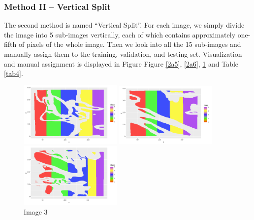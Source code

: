 \documentclass[11pt]{article}
\theoremstyle{definition}
\begin{document}
\subsubsection*{Method II -- Vertical Split}
The second method is named ``Vertical Split''. For each image, we simply divide the image into 5 sub-images vertically, each of which contains approximately one-fifth of pixels of the whole image. Then we look into all the 15 sub-images and manually assign them to the training, validation, and testing set. Visualization and manual assignment is displayed in Figure Figure \ref{2a5}, \ref{2a6}, \ref{2a7} and Table \ref{tab4}.

\begin{figure}[h]
\begin{minipage}[t]{0.33\textwidth}
\centering
\includegraphics[width=5cm]{figures/2a5.png}
\caption{Image 1}
\label{2a5}
\end{minipage}
\begin{minipage}[t]{0.33\textwidth}
\centering
\includegraphics[width=5cm]{figures/2a6.png}
\caption{Image 2}
\label{2a6}
\end{minipage}
\begin{minipage}[t]{0.33\textwidth}
\centering
\includegraphics[width=5cm]{figures/2a7.png}
\caption{Image 3}
\label{2a7}
\end{minipage}
\end{figure}
\FloatBarrier 
\end{document}

